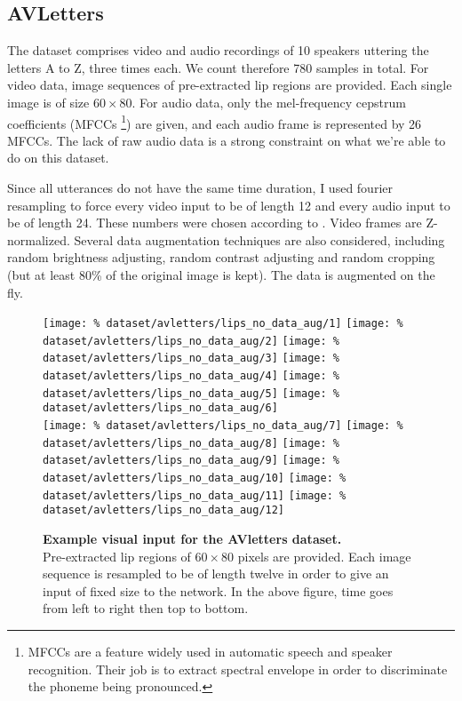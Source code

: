 \subsection{AVLetters}

The dataset comprises video and audio recordings of 10 speakers
uttering the letters A to Z, three times each.
We count therefore 780 samples in total. For video data, image sequences
of pre-extracted lip regions are provided.
Each single image is of size $60 \times 80$.
For audio data, only the mel-frequency cepstrum coefficients (MFCCs%
\footnote{MFCCs are a feature widely used in automatic speech and
speaker recognition. Their job is to extract spectral envelope
in order to discriminate the phoneme being pronounced.})
are given, and each audio frame is represented by 26 MFCCs.
The lack of raw audio data is a strong constraint on what we're able to do
on this dataset.

Since all utterances do not have the same time duration, I used
fourier resampling to force every video input to be of length 12 and
every audio input to be of length 24. These numbers were chosen according
to \cite{S. Moon 2015}. Video frames are Z-normalized.
Several data augmentation techniques are also considered, including
random brightness adjusting, random contrast adjusting and random
cropping (but at least 80\% of the original image is kept).
The data is augmented on the fly.

\begin{figure}[H]
  \centering
  \texttt{[image: \%
    dataset/avletters/lips\_no\_data\_aug/1]}
  \texttt{[image: \%
    dataset/avletters/lips\_no\_data\_aug/2]}
  \texttt{[image: \%
    dataset/avletters/lips\_no\_data\_aug/3]}
  \texttt{[image: \%
    dataset/avletters/lips\_no\_data\_aug/4]}
  \texttt{[image: \%
    dataset/avletters/lips\_no\_data\_aug/5]}
  \texttt{[image: \%
    dataset/avletters/lips\_no\_data\_aug/6]}\\[0.15em]
  \texttt{[image: \%
    dataset/avletters/lips\_no\_data\_aug/7]}
  \texttt{[image: \%
    dataset/avletters/lips\_no\_data\_aug/8]}
  \texttt{[image: \%
    dataset/avletters/lips\_no\_data\_aug/9]}
  \texttt{[image: \%
    dataset/avletters/lips\_no\_data\_aug/10]}
  \texttt{[image: \%
    dataset/avletters/lips\_no\_data\_aug/11]}
  \texttt{[image: \%
    dataset/avletters/lips\_no\_data\_aug/12]}
  \caption{%
    \textbf{Example visual input for the AVletters dataset.}\\[0.1em]
    Pre-extracted lip regions of $60 \times 80$ pixels are provided.
      Each image sequence is resampled to be of length twelve in order to
      give an input of fixed size to the network. In the above figure,
      time goes from left to right then top to bottom.}
  \label{fig:avletters_exs}
\end{figure}

